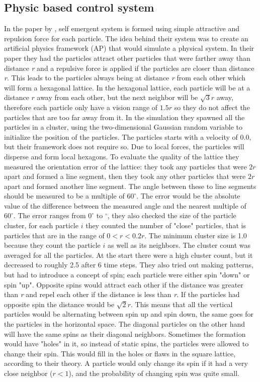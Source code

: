 \subsection{Physic based control system}
In the paper \citep{Spears2004} by \citeauthor{Spears2004}, self emergent system is formed using simple attractive and repulsion force for each particle. The idea behind their system was to create an artificial physics framework (AP) that would simulate a physical system. In their paper they had the particles attract other particles that were farther away than distance \textit{r} and a repulsive force is applied if the particles are closer than distance \textit{r}. This leads to the particles always being at distance \textit{r} from each other which will form a hexagonal lattice. In the hexagonal lattice, each particle will be at a distance $r$ away from each other, but the next neighbor will be $\sqrt{3}r$ away, therefore each particle only have a vision range of $1.5r$ so they do not affect the particles that are too far away from it. In the simulation they spawned all the particles in a cluster, using the two-dimensional Gaussian random variable to initialize the position of the particles. The particles starts with a velocity of 0.0, but their framework does not require so. Due to local forces, the particles will disperse and form local hexagons. To evaluate the quality of the lattice they measured the orientation error of the lattice: they took any particles that were $2r$ apart and formed a line segment, then they took any other particles that were $2r$ apart and formed another line segment. The angle between these to line segments should be measured to be a multiple of $60^{\circ}$. The error would be the absolute value of the difference between the measured angle and the nearest multiple of $60^{\circ}$. The error ranges from $0^{\circ}$ to $^{\circ}$, they also checked the size of the particle cluster, for each particle $i$ they counted the number of "close" particles, that is particles that are in the range of $0<r<0.2r$. The minimum cluster size is 1.0 because they count the particle $i$ as well as its neighbors. The cluster count was averaged for all the particles. At the start there were a high cluster count, but it decreased to roughly 2.5 after 6 time steps. 
They also tried out making patterns, but had to introduce a concept of spin; each particle were either spin "down" or spin "up". Opposite spins would attract each other if the distance was greater than \textit{r} and repel each other if the distance is less than \textit{r}. If the particles had opposite spin the distance would be $\sqrt{2}r$. This means that all the vertical particles would be alternating between spin up and spin down, the same goes for the particles in the horizontal space. The diagonal particles on the other hand will have the same spins as their diagonal neighbors. Sometimes the formation would have "holes" in it, so instead of static spins, the particles were allowed to change their spin. This would fill in the holes or flaws in the square lattice, according to their theory.
A particle would only change its spin if it had a very close neighbor ($r<1$), and the probability of changing spin was quite small.


